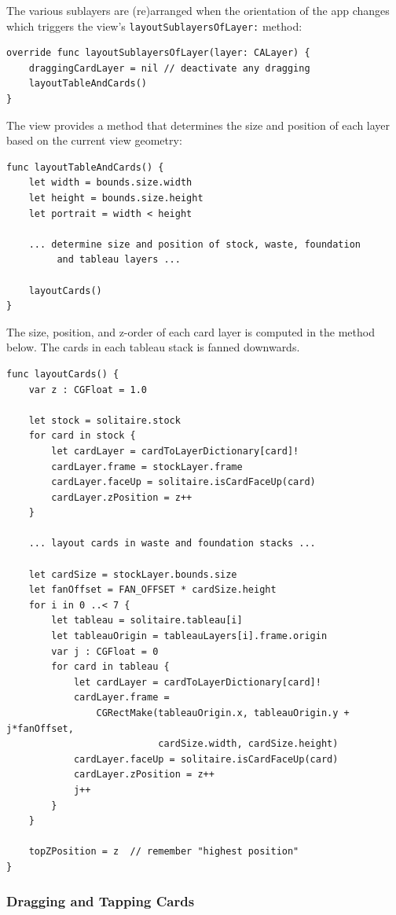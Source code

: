 \documentclass[11pt]{article}
\begin{document}
The various sublayers are (re)arranged when the orientation
of the app changes which triggers the 
view's {\tt layoutSublayersOfLayer:} method:
\begin{verbatim}
override func layoutSublayersOfLayer(layer: CALayer) {
    draggingCardLayer = nil // deactivate any dragging
    layoutTableAndCards()
}
\end{verbatim}
The view provides a method that determines the size and position
of each layer based on the current view geometry:
\begin{verbatim}
func layoutTableAndCards() {
    let width = bounds.size.width
    let height = bounds.size.height
    let portrait = width < height
    
    ... determine size and position of stock, waste, foundation
         and tableau layers ...
    
    layoutCards()
}
\end{verbatim}
The size, position, and z-order of each card layer is computed
in the method below. The cards in each tableau stack is fanned downwards.
\begin{verbatim}
func layoutCards() {
    var z : CGFloat = 1.0
      
    let stock = solitaire.stock
    for card in stock {
        let cardLayer = cardToLayerDictionary[card]!
        cardLayer.frame = stockLayer.frame
        cardLayer.faceUp = solitaire.isCardFaceUp(card)
        cardLayer.zPosition = z++
    }
 
    ... layout cards in waste and foundation stacks ...
    
    let cardSize = stockLayer.bounds.size
    let fanOffset = FAN_OFFSET * cardSize.height
    for i in 0 ..< 7 {
        let tableau = solitaire.tableau[i]
        let tableauOrigin = tableauLayers[i].frame.origin
        var j : CGFloat = 0
        for card in tableau {
            let cardLayer = cardToLayerDictionary[card]!
            cardLayer.frame = 
                CGRectMake(tableauOrigin.x, tableauOrigin.y + j*fanOffset, 
                           cardSize.width, cardSize.height)
            cardLayer.faceUp = solitaire.isCardFaceUp(card)
            cardLayer.zPosition = z++
            j++
        }
    }
    
    topZPosition = z  // remember "highest position"
}
\end{verbatim}


\subsubsection{Dragging and Tapping Cards}
\end{document}
